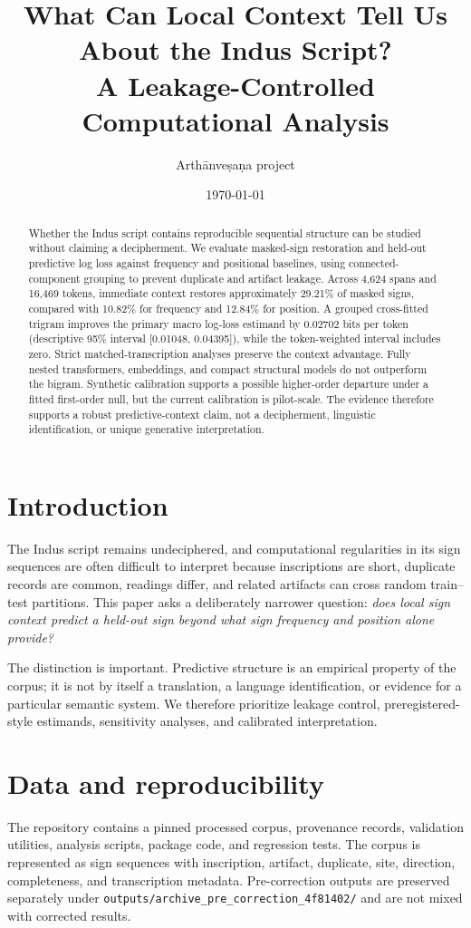 \documentclass[11pt]{article}
\title{What Can Local Context Tell Us About the Indus Script?\\\large A Leakage-Controlled Computational Analysis}
\author{Arth\=anve\d sa\d na project}
\date{\today}
\begin{document}
\maketitle

\begin{abstract}
Whether the Indus script contains reproducible sequential structure can be studied without claiming a decipherment. We evaluate masked-sign restoration and held-out predictive log loss against frequency and positional baselines, using connected-component grouping to prevent duplicate and artifact leakage. Across 4,624 spans and 16,469 tokens, immediate context restores approximately 29.21\% of masked signs, compared with 10.82\% for frequency and 12.84\% for position. A grouped cross-fitted trigram improves the primary macro log-loss estimand by 0.02702 bits per token (descriptive 95\% interval [0.01048, 0.04395]), while the token-weighted interval includes zero. Strict matched-transcription analyses preserve the context advantage. Fully nested transformers, embeddings, and compact structural models do not outperform the bigram. Synthetic calibration supports a possible higher-order departure under a fitted first-order null, but the current calibration is pilot-scale. The evidence therefore supports a robust predictive-context claim, not a decipherment, linguistic identification, or unique generative interpretation.
\end{abstract}

\section{Introduction}
The Indus script remains undeciphered, and computational regularities in its sign sequences are often difficult to interpret because inscriptions are short, duplicate records are common, readings differ, and related artifacts can cross random train--test partitions. This paper asks a deliberately narrower question: \emph{does local sign context predict a held-out sign beyond what sign frequency and position alone provide?}

The distinction is important. Predictive structure is an empirical property of the corpus; it is not by itself a translation, a language identification, or evidence for a particular semantic system. We therefore prioritize leakage control, preregistered-style estimands, sensitivity analyses, and calibrated interpretation.

\section{Data and reproducibility}
The repository contains a pinned processed corpus, provenance records, validation utilities, analysis scripts, package code, and regression tests. The corpus is represented as sign sequences with inscription, artifact, duplicate, site, direction, completeness, and transcription metadata. Pre-correction outputs are preserved separately under \texttt{outputs/archive\_pre\_correction\_4f81402/} and are not mixed with corrected results.
\end{document}
